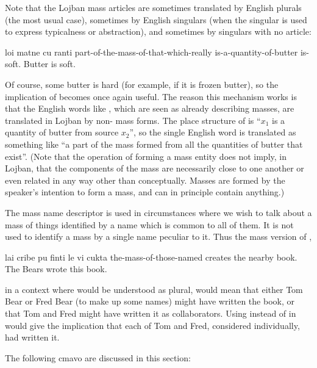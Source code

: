 Note that the Lojban mass articles are sometimes translated
    by English plurals (the most usual case), sometimes by English
    singulars (when the singular is used to express typicalness or
    abstraction), and sometimes by singulars with no article:
\begin{example}
loi matne cu ranti\n
part-of-the-mass-of-that-which-really\n
\T	is-a-quantity-of-butter is-soft.\n
Butter is soft.
\end{example}

Of course, some butter is hard (for example, if it is frozen
    butter), so the  implication of  becomes once
    again useful. The reason this mechanism works is that the
    English words like , which are seen as already
    describing masses, are translated in Lojban by non- mass forms.
    The place structure of  is ``$x_1$ is a quantity of
    butter from source $x_2$'', so the single English word 
    is translated as something like ``a part of the mass formed
    from all the quantities of butter that exist''. (Note that the
    operation of forming a mass entity does not imply, in Lojban,
    that the components of the mass are necessarily close to one
    another or even related in any way other than conceptually.
    Masses are formed by the speaker's intention to form a mass,
    and can in principle contain anything.) 

The mass name descriptor  is used in circumstances
    where we wish to talk about a mass of things identified by a
    name which is common to all of them. It is not used to identify
    a mass by a single name peculiar to it. Thus the mass version
    of ,
\begin{example}
lai cribe pu finti\n
\T	le vi cukta\n
the-mass-of-those-named   creates\n
\T	the nearby book.\n
The Bears wrote this book.
\end{example}

{\noindent}in a context where  would be understood as plural,
    would mean that either Tom Bear or Fred Bear (to make up some
    names) might have written the book, or that Tom and Fred might
    have written it as collaborators. Using  instead of
     in  would give the
    implication that each of Tom and Fred, considered individually,
    had written it.



The following cmavo are discussed in this section:

